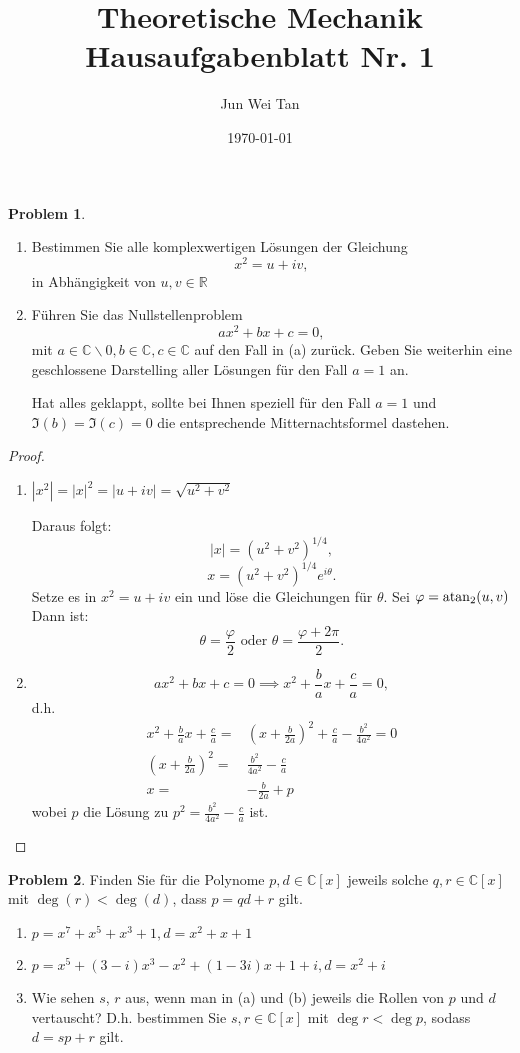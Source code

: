 \documentclass[prb,12pt]{revtex4-2}
\theoremstyle{definition}
\newtheorem{Problem}{Problem}
\theoremstyle{definition}
\newenvironment{parts}{\begin{enumerate}[label=(\alph*)]}{\end{enumerate}}
\newcommand{\R}{\mathbb{R}}
\newcommand{\C}{\mathbb{C}}
\begin{document}
	\title{Theoretische Mechanik Hausaufgabenblatt Nr. 1}
	\author{Jun Wei Tan}
	\date{\today}
	\maketitle

\begin{Problem}
	\begin{parts}	
		\item Bestimmen Sie alle komplexwertigen Lösungen der Gleichung
	\[
	x^2=u+iv,\] 
	in Abh\"{a}ngigkeit von $u,v\in \R$

\item F\"{u}hren Sie das Nullstellenproblem
	\[
		ax^2+bx+c=0,\]
		mit $a\in\C\backslash 0, b\in \C, c\in \C$ auf den Fall in (a) zur\"{u}ck. Geben Sie weiterhin eine geschlossene Darstelling aller L\"{o}sungen f\"{u}r den Fall $a=1$ an.

		Hat alles geklappt, sollte bei Ihnen speziell für den Fall $a = 1$ und $\Im(b) = \Im(c) = 0$ die entsprechende Mitternachtsformel dastehen.
		\end{parts}
\end{Problem}
\begin{proof}
	\begin{parts}
	\item $\left| x^2 \right| =|x|^2=|u+iv|=\sqrt{u^2+v^2}$ 

		Daraus folgt:
		\[
			|x|=(u^2+v^2)^{1 / 4}
		,\]
		\[
			x=(u^2+v^2)^{1 / 4}e^{i\theta} 
		.\] 
		Setze es in $x^2=u+iv$ ein und löse die Gleichungen für $\theta$. Sei $\varphi=\atan_2(u,v)$ Dann ist:
		 \[
			 \theta=\frac{\varphi}{2}\text{ oder }\theta=\frac{\varphi+2\pi}{2}
		 .\]

	\item \[
			ax^2+bx+c=0\implies x^2+\frac{b}{a}x+\frac{c}{a}=0
	,\]
	d.h.
	\begin{align*}
		x^2+\frac{b}{a}x+\frac{c}{a}=& \left( x+\frac{b}{2a} \right)^2+\frac{c}{a}-\frac{b^2}{4a^2}=0\\
		\left( x+\frac{b}{2a} \right)^2=&\frac{b^2}{4a^2}-\frac{c}{a}\\
		x=&-\frac{b}{2a}+p
	\end{align*}
	wobei $p$ die L\"{o}sung zu $p^2=\frac{b^2}{4a^2}-\frac{c}{a}$ ist. 
	\end{parts}
\end{proof}
\begin{Problem}
	Finden Sie f\"{u}r die Polynome $p,d\in \C[x]$ jeweils solche $q,r\in \C[x]$ mit $\deg(r)<\deg(d)$, dass $p=qd+r$ gilt.
	\begin{parts}
	\item $p=x^7+x^5+x^3+1, d=x^2+x+1$
	\item $p=x^5+(3-i)x^3-x^2+(1-3i)x+1+i,d=x^2+i$
	\item  Wie sehen $s$, $r$ aus, wenn man in (a) und (b) jeweils die Rollen von $p$ und $d$ vertauscht? D.h. bestimmen Sie $s,r\in \C[x]$ mit $\deg r < \deg p$, sodass $d=sp+r$ gilt.
	\end{parts}
\end{Problem}
\end{document}
